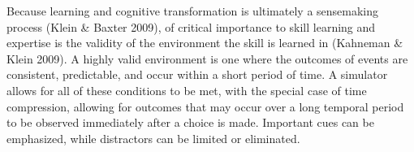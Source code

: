 \documentclass{book}
\begin{document}
Because learning and cognitive transformation is ultimately a sensemaking process (Klein & Baxter 2009), of critical importance to skill learning and expertise is the validity of the environment the skill is learned in (Kahneman & Klein 2009). A highly valid environment is one where the outcomes of events are consistent, predictable, and occur within a short period of time. A simulator allows for all of these conditions to be met, with the special case of time compression, allowing for outcomes that may occur over a long temporal period to be observed immediately after a choice is made. Important cues can be emphasized, while distractors can be limited or eliminated.
\end{document}
